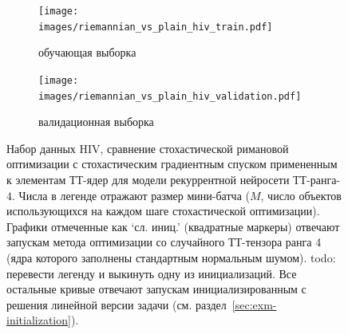 \begin{figure}
    \centering
    \begin{subfigure}[b]{\textwidth}
        \texttt{[image: images/riemannian\_vs\_plain\_hiv\_train.pdf]}
        \caption{обучающая выборка}
    \end{subfigure}
    \begin{subfigure}[b]{\textwidth}
        \texttt{[image: images/riemannian\_vs\_plain\_hiv\_validation.pdf]}
        \caption{валидационная выборка}
    \end{subfigure}
    \caption{Набор данных HIV, сравнение стохастической римановой оптимизации с стохастическим градиентным спуском примененным к элементам ТТ-ядер для модели рекуррентной нейросети ТТ-ранга-$4$. Числа в легенде отражают размер мини-батча ($M$, число объектов использующихся на каждом шаге стохастической оптимизации). Графики отмеченные как `сл. иниц.' (квадратные  маркеры) отвечают запускам метода оптимизации со случайного ТТ-тензора ранга 4 (ядра которого заполнены стандартным нормальным шумом). \alert{todo: перевести легенду и выкинуть одну из инициализаций}.
Все остальные кривые отвечают запускам инициализированным с решения линейной версии задачи (см. раздел~\ref{sec:exm-initialization}).}\label{fig:riemannian_vs_plain_hiv}
\end{figure}

